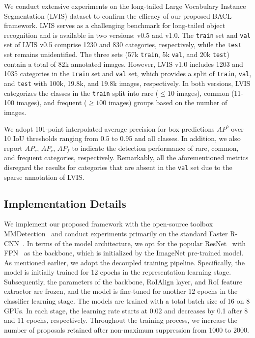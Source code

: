 \documentclass[lettersize,journal]{IEEEtran}
\begin{document}
We conduct extensive experiments on the long-tailed Large Vocabulary Instance Segmentation (LVIS) dataset to confirm the efficacy of our proposed BACL framework.
LVIS serves as a challenging benchmark for long-tailed object recognition and is available in two versions: v0.5 and v1.0.
The \texttt{train} set and \texttt{val} set of LVIS v0.5 comprise 1230 and 830 categories, respectively, while the \texttt{test} set remains unidentified.
The three sets (57k \texttt{train}, 5k \texttt{val}, and 20k \texttt{test}) contain a total of 82k annotated images.
However, LVIS v1.0 includes 1203 and 1035 categories in the \texttt{train} set and \texttt{val} set, which provides a split of \texttt{train}, \texttt{val}, and \texttt{test} with 100k, 19.8k, and 19.8k images, respectively.
In both versions, LVIS categorizes the classes in the \texttt{train} split into rare ($\leq 10$ images), common (11-100 images), and frequent ($\geq 100$ images) groups based on the number of images.

We adopt 101-point interpolated average precision for box predictions $AP^{b}$ over 10 IoU thresholds ranging from 0.5 to 0.95 and all classes.
In addition, we also report $AP_{r}$, $AP_{c}$, $AP_{f}$ to indicate the detection performance of rare, common, and frequent categories, respectively.
Remarkably, all the aforementioned metrics disregard the results for categories that are absent in the \texttt{val} set due to the sparse annotation of LVIS.





\subsection{Implementation Details}

We implement our proposed framework with the open-source toolbox MMDetection~\cite{chen2019mmdetection} and conduct experiments primarily on the standard Faster R-CNN~\cite{ren2015faster}.
In terms of the model architecture, we opt for the popular ResNet~\cite{he2016deep} with FPN~\cite{lin2017feature} as the backbone, which is initialized by the ImageNet pre-trained model.
As mentioned earlier, we adopt the decoupled training pipeline.
Specifically, the model is initially trained for 12 epochs in the representation learning stage. Subsequently, the parameters of the backbone, RoIAlign layer, and RoI feature extractor are frozen, and the model is fine-tuned for another 12 epochs in the classifier learning stage.
The models are trained with a total batch size of 16 on 8 GPUs.
In each stage, the learning rate starts at 0.02 and decreases by 0.1 after 8 and 11 epochs, respectively.
Throughout the training process, we increase the number of proposals retained after non-maximum suppression from 1000 to 2000.
\end{document}
